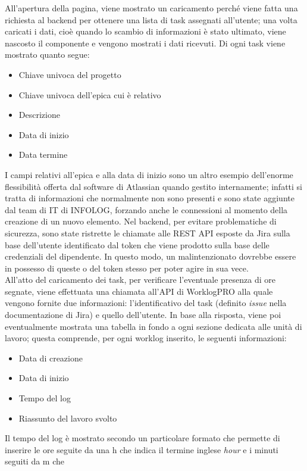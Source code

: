 All'apertura della pagina, viene mostrato un caricamento perché viene fatta una richiesta al backend per ottenere una lista di task assegnati all'utente; una volta caricati i dati,
cioè quando lo scambio di informazioni è stato ultimato, viene nascosto il componente e vengono mostrati i dati ricevuti.
Di ogni task viene mostrato quanto segue:
\begin{itemize}
    \item Chiave univoca del progetto
    \item Chiave univoca dell'epica cui è relativo
    \item Descrizione
    \item Data di inizio
    \item Data termine
\end{itemize}
I campi relativi all'epica e alla data di inizio sono un altro esempio dell'enorme flessibilità offerta dal software di Atlassian quando gestito internamente; 
infatti si tratta di informazioni che normalmente non sono presenti e sono state aggiunte dal team di IT di INFOLOG, forzando anche le connessioni al momento della creazione di un 
nuovo elemento.
Nel backend, per evitare problematiche di sicurezza, sono state ristrette le chiamate alle REST API esposte da Jira sulla base dell'utente identificato dal token che viene prodotto
sulla base delle credenziali del dipendente.
In questo modo, un malintenzionato dovrebbe essere in possesso di queste o del token stesso per poter agire in sua vece.
\\
All'atto del caricamento dei task, per verificare l'eventuale presenza di ore segnate, viene effettuata una chiamata all'API di WorklogPRO alla quale vengono fornite due informazioni: 
l'identificativo del task (definito \emph{issue} nella documentazione di Jira) e quello dell'utente.
In base alla risposta, viene poi eventualmente mostrata una tabella in fondo a ogni sezione dedicata alle unità di lavoro; questa comprende, per ogni worklog inserito, le seguenti
informazioni:
\begin{itemize}
    \item Data di creazione
    \item Data di inizio
    \item Tempo del log
    \item Riassunto del lavoro svolto
\end{itemize}
Il tempo del log è mostrato secondo un particolare formato che permette di inserire le ore seguite da una h che indica il termine inglese \emph{hour} e i minuti seguiti da m che 
